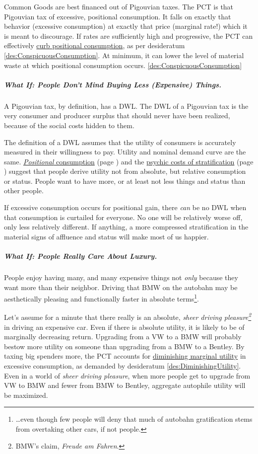 Common Goods are best financed out of Pigouvian taxes. The PCT is that Pigouvian tax of excessive, positional consumption. It falls on exactly that behavior (excessive consumption) at exactly that price (marginal rate!) which it is meant to discourage. If rates are sufficiently high and progressive, the PCT can effectively \hyperref[des:ConspicuousConsumption]{curb positional consumption}, as per desideratum \ref{des:ConspicuousConsumption}. At minimum, it can lower the level of material waste at which positional consumption occurs. \ref{des:ConspicuousConsumption}

\subparagraph{What If: People Don't Mind Buying Less (Expensive) Things.} A Pigouvian tax, by definition, has a DWL. The DWL of a Pigouvian tax is the very consumer and producer surplus that should never have been realized, because of the social costs hidden to them. 

The definition of a DWL assumes that the utility of consumers is accurately measured in their willingness to pay. Utility and nominal demand curve are the same. \hyperref[sec:ConspicuousConsumption]{\emph{Positional} consumption} (page \pageref{sec:ConspicuousConsumption}) and the \hyperref[sec:PsychicCosts]{psychic costs of stratification} (page \pageref{sec:PsychicCosts}) suggest that people derive utility not from absolute, but relative consumption or status. People want to have more, or at least not less things and status than other people.

If excessive consumption occurs for positional gain, there \emph{can} be no DWL when that consumption is curtailed for everyone. No one will be relatively worse off, only less relatively different. If anything, a more compressed stratification in the material signs of affluence and status will make most of us happier.

\subparagraph{What If: People Really Care About Luxury.} People enjoy having many, and many expensive things not \emph{only} because they want more than their neighbor. Driving that BMW on the autobahn may be aesthetically pleasing and functionally faster in absolute terms\footnote{
	\ldots even though few people will deny that much of autobahn gratification stems from overtaking other cars, if not people.}.

Let's assume for a minute that there really is an absolute, \emph{sheer driving pleasure\footnote{
	BMW's claim, \emph{Freude am Fahren}.}} 
in driving an expensive car. Even if there is absolute utility, it is likely to be of marginally decreasing return. Upgrading from a VW to a BMW will probably bestow more utility on someone than upgrading from a BMW to a Bentley. By taxing big spenders more, the PCT accounts for \hyperref[des:DiminishingUtility]{diminishing marginal utility} in excessive consumption, as demanded by desideratum \ref{des:DiminishingUtility}. Even in a world of \emph{sheer driving pleasure}, when more people get to upgrade from VW to BMW and fewer from BMW to Bentley, aggregate autophile utility will be maximized.

